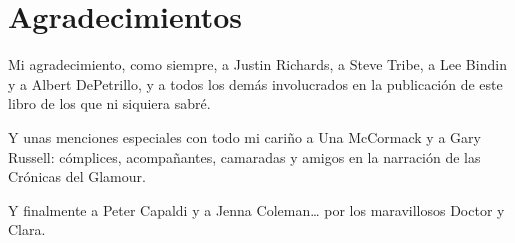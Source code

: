 \chapter*{Agradecimientos}

{Mi agradecimiento, como siempre, a Justin Richards, a Steve Tribe, a Lee
 Bindin y a Albert DePetrillo, y a todos los demás involucrados en la
publicación de este libro de los que ni siquiera sabré.}

{Y unas menciones especiales con todo mi cariño a Una McCormack y a Gary
 Russell: cómplices, acompañantes, camaradas y amigos en la narración de
las Crónicas del Glamour.}

{Y finalmente a Peter Capaldi y a Jenna Coleman\ldots{} por los
maravillosos Doctor y Clara.}
